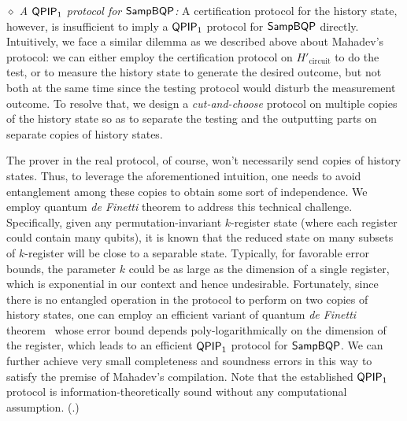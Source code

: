 

\vspace{2mm} \noindent \emph{$\diamond$ A $\operatorname{\mathsf{QPIP}}_1$ protocol for $\operatorname{\mathsf{SampBQP}}$:} A certification protocol for the history state, however, is insufficient to imply a $\operatorname{\mathsf{QPIP}}_1$ protocol for $\operatorname{\mathsf{SampBQP}}$ directly. 
Intuitively, we face a similar dilemma as we described above about Mahadev's protocol: we can either employ the certification protocol on $H'_{\mathrm{circuit}}$ to do the test, or to measure the history state to generate the desired outcome, but not both at the same time since the testing protocol would disturb the measurement outcome.
To resolve that, we design a \emph{cut-and-choose} protocol on multiple copies of the history state so as to separate the testing and the outputting parts on separate copies of history states. 

The prover in the real protocol, of course, won't necessarily send copies of history states. Thus, to leverage the aforementioned intuition, one needs to avoid entanglement among these copies to obtain some sort of independence. 
We employ quantum \emph{de Finetti} theorem to address this technical challenge.
Specifically, given any permutation-invariant $k$-register state (where each register could contain many qubits), it is known that the reduced state on many subsets of $k$-register will be close to a separable state. 
Typically, for favorable error bounds, the parameter $k$ could be as large as the dimension of a single register, which is exponential in our context and hence undesirable. 
Fortunately, since there is no entangled operation in the protocol to perform on two copies of history states, one can employ an efficient variant of quantum \emph{de Finetti} theorem~\cite{Brandao2017} whose error bound depends poly-logarithmically on the dimension of the register, which leads to an efficient $\operatorname{\mathsf{QPIP}}_1$ protocol for $\operatorname{\mathsf{SampBQP}}$. 
We can further achieve very small completeness and soundness errors in this way to satisfy the premise of Mahadev's compilation.  
Note that the established $\operatorname{\mathsf{QPIP}}_1$ protocol is information-theoretically sound without any computational assumption.  (.)


